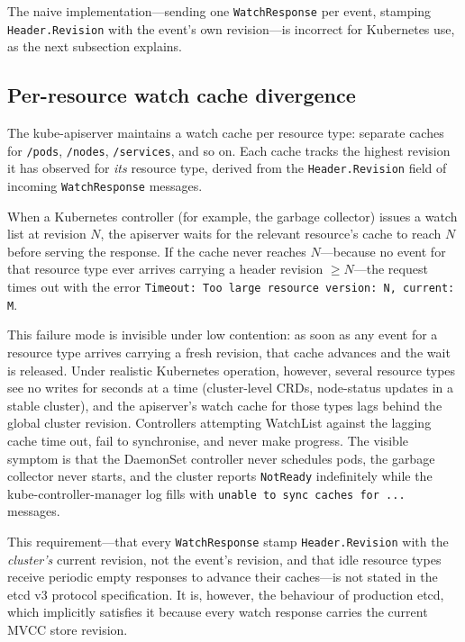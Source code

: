 The naive implementation---sending one \texttt{WatchResponse} per event, stamping \texttt{Header.Revision} with the event's own revision---is incorrect for Kubernetes use, as the next subsection explains.

\subsection{Per-resource watch cache divergence}
\label{sec:design-watch-cache}

The kube-apiserver maintains a watch cache per resource type: separate caches for \texttt{/pods}, \texttt{/nodes}, \texttt{/services}, and so on. Each cache tracks the highest revision it has observed for \emph{its} resource type, derived from the \texttt{Header.Revision} field of incoming \texttt{WatchResponse} messages.

When a Kubernetes controller (for example, the garbage collector) issues a watch list at revision $N$, the apiserver waits for the relevant resource's cache to reach $N$ before serving the response. If the cache never reaches $N$---because no event for that resource type ever arrives carrying a header revision $\geq N$---the request times out with the error \texttt{Timeout: Too large resource version: N, current: M}.

This failure mode is invisible under low contention: as soon as any event for a resource type arrives carrying a fresh revision, that cache advances and the wait is released. Under realistic Kubernetes operation, however, several resource types see no writes for seconds at a time (cluster-level CRDs, node-status updates in a stable cluster), and the apiserver's watch cache for those types lags behind the global cluster revision. Controllers attempting WatchList against the lagging cache time out, fail to synchronise, and never make progress. The visible symptom is that the DaemonSet controller never schedules pods, the garbage collector never starts, and the cluster reports \texttt{NotReady} indefinitely while the kube-controller-manager log fills with \texttt{unable to sync caches for ...} messages.

This requirement---that every \texttt{WatchResponse} stamp \texttt{Header.Revision} with the \emph{cluster's} current revision, not the event's revision, and that idle resource types receive periodic empty responses to advance their caches---is not stated in the etcd v3 protocol specification. It is, however, the behaviour of production etcd, which implicitly satisfies it because every watch response carries the current MVCC store revision.

